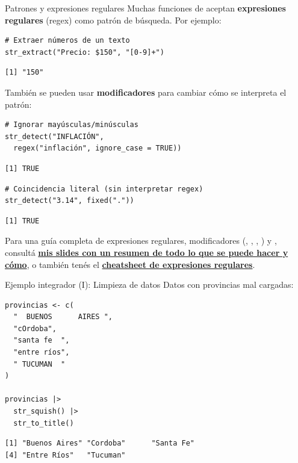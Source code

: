 \documentclass[8pt]{beamer}
\begin{document}
\begin{frame}[fragile]{Patrones y expresiones regulares}
	Muchas funciones de  aceptan \textbf{expresiones regulares} (regex) como patrón de búsqueda. Por ejemplo:
\begin{lstlisting}[style=RScript]
# Extraer números de un texto
str_extract("Precio: $150", "[0-9]+")
\end{lstlisting}
\begin{lstlisting}[style=RConsole]
[1] "150"
\end{lstlisting}

	También se pueden usar \textbf{modificadores} para cambiar cómo se interpreta el patrón:
\begin{lstlisting}[style=RScript]
# Ignorar mayúsculas/minúsculas
str_detect("INFLACIÓN",
  regex("inflación", ignore_case = TRUE))
\end{lstlisting}
\begin{lstlisting}[style=RConsole]
[1] TRUE
\end{lstlisting}
\begin{lstlisting}[style=RScript]
# Coincidencia literal (sin interpretar regex)
str_detect("3.14", fixed("."))
\end{lstlisting}
\begin{lstlisting}[style=RConsole]
[1] TRUE
\end{lstlisting}
\end{frame}




\begin{frame}[fragile]
	Para una guía completa de expresiones regulares, modificadores (, , , ) y , consultá \href{https://github.com/gxono/r_limpieza_manipulacion_exploracion/blob/main/presentaciones/machetes/regex/main.pdf}{\textbf{mis slides con un resumen de todo lo que se puede hacer y c\'omo}}, o tambi\'en ten\'es el \href{https://github.com/rstudio/cheatsheets/blob/main/regex.pdf}{\textbf{cheatsheet de expresiones regulares}}.
\end{frame}




\begin{frame}[fragile]{Ejemplo integrador (I): Limpieza de datos}
	Datos con provincias mal cargadas:
\begin{lstlisting}[style=RScript]
provincias <- c(
  "  BUENOS      AIRES ",
  "cOrdoba",
  "santa fe  ",
  "entre ríos",
  " TUCUMAN  "
)

provincias |>
  str_squish() |>
  str_to_title()
\end{lstlisting}
\begin{lstlisting}[style=RConsole]
[1] "Buenos Aires" "Cordoba"      "Santa Fe"
[4] "Entre Ríos"   "Tucuman"
\end{lstlisting}
\end{frame}
\end{document}
